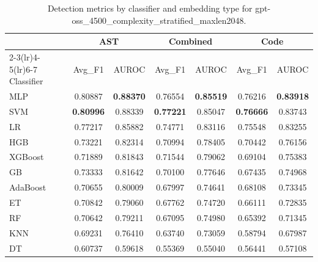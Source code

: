 \begin{table}[t]
\centering
\caption{Detection metrics by classifier and embedding type for gpt-oss\_4500\_complexity\_stratified\_maxlen2048.}
\label{tab:rq2d_gpt-oss_4500_complexity_stratified_maxlen2048}
\begin{tabular}{l cc cc cc}
\toprule
 & \multicolumn{2}{c}{AST} & \multicolumn{2}{c}{Combined} & \multicolumn{2}{c}{Code} \\
\cmidrule(lr){2-3}\cmidrule(lr){4-5}\cmidrule(lr){6-7}
Classifier & Avg\_F1 & AUROC & Avg\_F1 & AUROC & Avg\_F1 & AUROC \\
\midrule
MLP & 0.80887 & \textbf{0.88370} & 0.76554 & \textbf{0.85519} & 0.76216 & \textbf{0.83918} \\
SVM & \textbf{0.80996} & 0.88339 & \textbf{0.77221} & 0.85047 & \textbf{0.76666} & 0.83743 \\
LR & 0.77217 & 0.85882 & 0.74771 & 0.83116 & 0.75548 & 0.83255 \\
HGB & 0.73221 & 0.82314 & 0.70994 & 0.78405 & 0.70442 & 0.76156 \\
XGBoost & 0.71889 & 0.81843 & 0.71544 & 0.79062 & 0.69104 & 0.75383 \\
GB & 0.73333 & 0.81642 & 0.70100 & 0.77646 & 0.67435 & 0.74968 \\
AdaBoost & 0.70655 & 0.80009 & 0.67997 & 0.74641 & 0.68108 & 0.73345 \\
ET & 0.70842 & 0.79060 & 0.67762 & 0.74720 & 0.66111 & 0.72835 \\
RF & 0.70642 & 0.79211 & 0.67095 & 0.74980 & 0.65392 & 0.71345 \\
KNN & 0.69231 & 0.76410 & 0.63740 & 0.73059 & 0.58794 & 0.67987 \\
DT & 0.60737 & 0.59618 & 0.55369 & 0.55040 & 0.56441 & 0.57108 \\
\bottomrule
\end{tabular}
\end{table}
